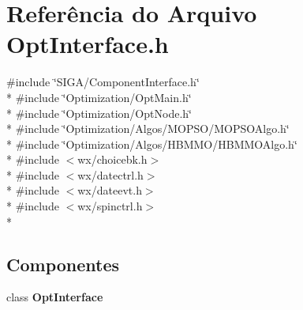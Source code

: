 \section{Referência do Arquivo Opt\+Interface.\+h}
\label{_opt_interface_8h}
{\ttfamily \#include \char`\"{}S\+I\+G\+A/\+Component\+Interface.\+h\char`\"{}}\\*
{\ttfamily \#include \char`\"{}Optimization/\+Opt\+Main.\+h\char`\"{}}\\*
{\ttfamily \#include \char`\"{}Optimization/\+Opt\+Node.\+h\char`\"{}}\\*
{\ttfamily \#include \char`\"{}Optimization/\+Algos/\+M\+O\+P\+S\+O/\+M\+O\+P\+S\+O\+Algo.\+h\char`\"{}}\\*
{\ttfamily \#include \char`\"{}Optimization/\+Algos/\+H\+B\+M\+M\+O/\+H\+B\+M\+M\+O\+Algo.\+h\char`\"{}}\\*
{\ttfamily \#include $<$wx/choicebk.\+h$>$}\\*
{\ttfamily \#include $<$wx/datectrl.\+h$>$}\\*
{\ttfamily \#include $<$wx/dateevt.\+h$>$}\\*
{\ttfamily \#include $<$wx/spinctrl.\+h$>$}\\*
\subsection*{Componentes}
\begin{DoxyCompactItemize}
\item 
class {\bf Opt\+Interface}
\end{DoxyCompactItemize}
